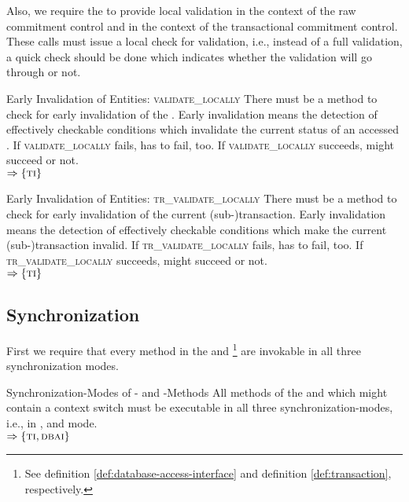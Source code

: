 \documentclass[a4paper, 12pt]{book}
\newcommand{\INTERFACE}[1]{$\Rightarrow\left\{#1\right\}$}
\begin{document}
\newcommand{\dbaiTRLVALIDATE}{{\normalfont\textsc{tr\_validate\_locally}}\xspace}
\newcommand{\dbaiLVALIDATE}{{\normalfont\textsc{validate\_locally}}\xspace}
Also, we require the \SYNEIGHT to provide local validation in the
context of the raw commitment control and in the context of the transactional
commitment control. These calls must issue a local check for validation, i.e.,
instead of a full validation, a quick check should be done which indicates
whether the validation will go through or not.
%
\begin{requirement*}{Early Invalidation of Entities: \dbaiLVALIDATE}
  There must be a method to check for early invalidation of the .
  Early invalidation means the detection of effectively checkable conditions
  which invalidate the current status of an accessed . If
  \dbaiLVALIDATE fails, \dbaiVALIDATE has to fail, too. If
  \dbaiLVALIDATE succeeds, \dbaiVALIDATE might succeed or not.\\
  \INTERFACE{\TRANSACTION}
\end{requirement*}
%
\begin{requirement*}{Early Invalidation of Entities: \dbaiTRLVALIDATE}
  There must be a method to check for early invalidation of the current
  (sub-)transaction. Early invalidation means the detection of effectively
  checkable conditions which make the current (sub-)transaction invalid. If
  \dbaiTRLVALIDATE fails, \dbaiTRVALIDATE has to fail, too. If
  \dbaiTRLVALIDATE succeeds, \dbaiTRVALIDATE might succeed or not.\\
  \INTERFACE{\TRANSACTION}
\end{requirement*}



\subsection{Synchronization}

First we require that every method in the \DBAI and
\TRANSACTION\footnote{See definition
\vref{def:database-access-interface} and definition
\vref{def:transaction}, respectively.} are invokable in all three
synchronization modes.
%
\begin{requirement*}{Synchronization-Modes of \DBAI- and \TRANSACTION-Methods}
  All methods of the \DBAI and \TRANSACTION which might contain a context
  switch must be executable in all three synchronization-modes, i.e., in
  ,
   and  mode.\\
  \INTERFACE{\TRANSACTION,\DBAI}
\end{requirement*}
\end{document}
